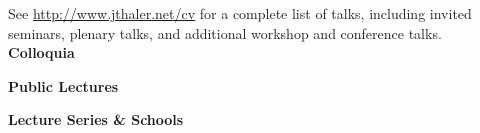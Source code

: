 
\bbl

\el

\newpage




 
%



See \url{http://www.jthaler.net/cv} for a complete list of talks, including invited seminars, plenary talks, and additional workshop and conference talks.\\

\noindent \textbf{Colloquia}




\noindent \textbf{Public Lectures}




\noindent \textbf{Lecture Series \& Schools}



